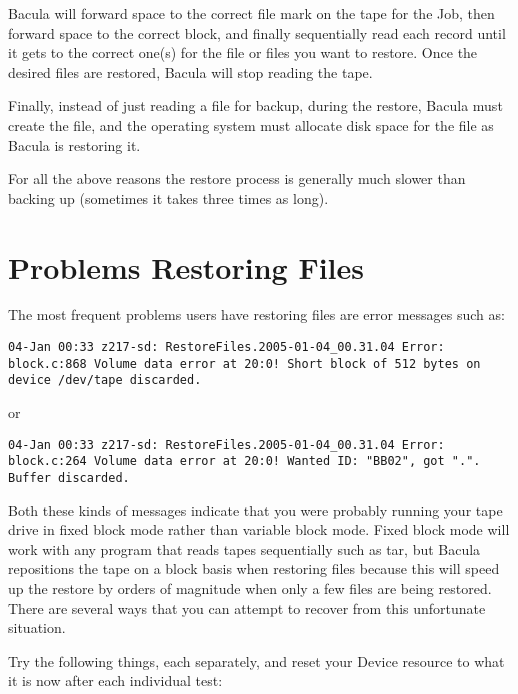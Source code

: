 Bacula will forward space to the correct file mark on the tape for the Job,
then forward space to the correct block, and finally sequentially read each
record until it gets to the correct one(s) for the file or files you want to
restore. Once the desired files are restored, Bacula will stop reading the
tape. 

Finally, instead of just reading a file for backup, during the restore, Bacula
must create the file, and the operating system must allocate disk space for
the file as Bacula is restoring it. 

For all the above reasons the restore process is generally much slower than
backing up (sometimes it takes three times as long).

\section{Problems Restoring Files}

The most frequent problems users have restoring files are error messages such
as: 

\footnotesize
\begin{verbatim}
04-Jan 00:33 z217-sd: RestoreFiles.2005-01-04_00.31.04 Error:
block.c:868 Volume data error at 20:0! Short block of 512 bytes on
device /dev/tape discarded.
\end{verbatim}
\normalsize

or 

\footnotesize
\begin{verbatim}
04-Jan 00:33 z217-sd: RestoreFiles.2005-01-04_00.31.04 Error:
block.c:264 Volume data error at 20:0! Wanted ID: "BB02", got ".".
Buffer discarded.
\end{verbatim}
\normalsize

Both these kinds of messages indicate that you were probably running your tape
drive in fixed block mode rather than variable block mode. Fixed block mode
will work with any program that reads tapes sequentially such as tar, but
Bacula repositions the tape on a block basis when restoring files because this
will speed up the restore by orders of magnitude when only a few files are being
restored. There are several ways that you can attempt to recover from this
unfortunate situation. 

Try the following things, each separately, and reset your Device resource to
what it is now after each individual test: 

